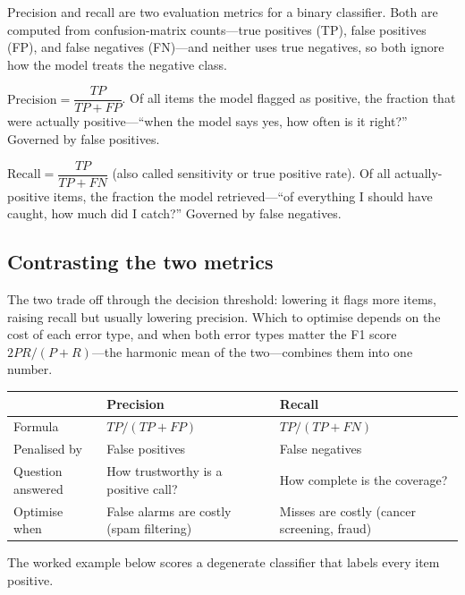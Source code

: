 Precision and recall are two evaluation metrics for a binary classifier. Both are computed from confusion-matrix counts---true positives (TP), false positives (FP), and false negatives (FN)---and neither uses true negatives, so both ignore how the model treats the negative class.

\begin{defbox}[Precision]
$\text{Precision} = \dfrac{TP}{TP + FP}$. Of all items the model flagged as positive, the fraction that were actually positive---``when the model says yes, how often is it right?'' Governed by false positives.
\end{defbox}

\begin{defbox}[Recall]
$\text{Recall} = \dfrac{TP}{TP + FN}$ (also called sensitivity or true positive rate). Of all actually-positive items, the fraction the model retrieved---``of everything I should have caught, how much did I catch?'' Governed by false negatives.
\end{defbox}

\subsection{Contrasting the two metrics}

The two trade off through the decision threshold: lowering it flags more items, raising recall but usually lowering precision. Which to optimise depends on the cost of each error type, and when both error types matter the F1 score $2PR/(P+R)$---the harmonic mean of the two---combines them into one number.

\begin{center}\begin{tabularx}{0.9\linewidth}{lXX}
\midrule
 & \textbf{Precision} & \textbf{Recall} \\
\midrule
Formula & $TP / (TP + FP)$ & $TP / (TP + FN)$ \\
Penalised by & False positives & False negatives \\
Question answered & How trustworthy is a positive call? & How complete is the coverage? \\
Optimise when & False alarms are costly (spam filtering) & Misses are costly (cancer screening, fraud) \\
\midrule
\end{tabularx}\end{center}

The worked example below scores a degenerate classifier that labels every item positive.

